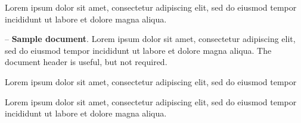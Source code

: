 \begin{example}
Lorem ipsum dolor sit amet, consectetur adipiscing elit, sed do eiusmod tempor
incididunt ut labore et dolore magna aliqua.
\end{example}

\begin{example}
-- {\bf Sample document}.
Lorem ipsum dolor sit amet, consectetur adipiscing elit, sed do eiusmod tempor
incididunt ut labore et dolore magna aliqua.
The document header is useful, but not required.
\end{example}

\begin{example}
\hypertarget{lorem}{Lorem ipsum dolor sit amet, consectetur adipiscing elit, sed do eiusmod tempor}
Lorem ipsum dolor sit amet, consectetur adipiscing elit, sed do eiusmod tempor
incididunt ut labore et dolore magna aliqua.
\end{example}
